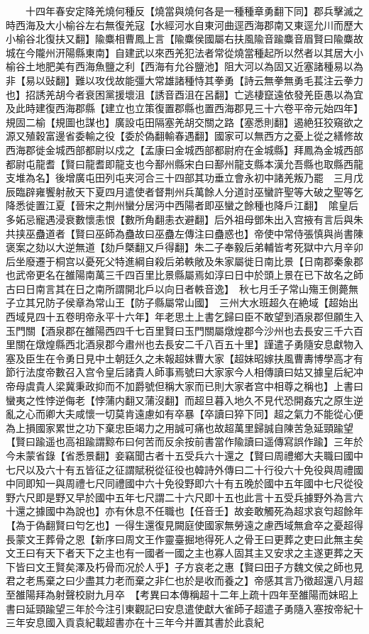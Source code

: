 　　十四年春安定降羌燒何種反【燒當與燒何各是一種種章勇翻下同】郡兵擊滅之時西海及大小榆谷左右無復羌寇【水經河水自東河曲逕西海郡南又東逕允川而歷大小榆谷北復扶又翻】隃麋相曹鳳上言【隃麋侯國屬右扶風隃音踰麋音眉賢曰隃麋故城在今隴州汧陽縣東南】自建武以來西羌犯法者常從燒當種起所以然者以其居大小榆谷土地肥美有西海魚鹽之利【西海有允谷鹽池】阻大河以為固又近塞諸種易以為非【易以䜴翻】難以攻伐故能彊大常雄諸種恃其拳勇【詩云無拳無勇毛萇注云拳力也】招誘羌胡今者衰困黨援壞沮【誘音酉沮在呂翻】亡逃棲竄遠依發羌臣愚以為宜及此時建復西海郡縣【建立也立策復置郡縣也置西海郡見三十六卷平帝元始四年】規固二榆【規圖也謀也】廣設屯田隔塞羌胡交關之路【塞悉則翻】遏絶狂狡窺欲之源又殖穀富邊省委輸之役【委於偽翻輸春遇翻】國家可以無西方之憂上從之繕修故西海郡徙金城西部都尉以戍之【孟康曰金城西部都尉府在金城縣】拜鳳為金城西部都尉屯龍耆【賢曰龍耆即龍支也今鄯州縣宋白曰鄯州龍支縣本漢允吾縣也取縣西龍支堆為名】後增廣屯田列屯夹河合三十四部其功垂立會永初中諸羌叛乃罷　三月戊辰臨辟雍饗射赦天下夏四月遣使者督荆州兵萬餘人分道討巫蠻許聖等大破之聖等乞降悉徙置江夏【晉宋之荆州蠻分居沔中西陽者即巫蠻之餘種也降戶江翻】　隂皇后多妬忌寵遇浸衰數懷恚恨【數所角翻恚衣避翻】后外祖母鄧朱出入宫掖有言后與朱共挟巫蠱道者【賢曰巫師為蠱故曰巫蠱左傳注曰蠱惑也】帝使中常侍張慎與尚書陳褒案之劾以大逆無道【劾戶槩翻又戶得翻】朱二子奉毅后弟輔皆考死獄中六月辛卯后坐廢遷于桐宫以憂死父特進綱自殺后弟軼敞及朱家屬徙日南比景【日南郡秦象郡也武帝更名在雒陽南萬三千四百里比景縣屬焉如淳曰日中於頭上景在已下故名之師古曰日南言其在日之南所謂開北戶以向日者軼音逸】　秋七月壬子常山殤王側薨無子立其兄防子侯章為常山王【防子縣屬常山國】　三州大水班超久在絶域【超始出西域見四十五卷明帝永平十六年】年老思土上書乞歸曰臣不敢望到酒泉郡但願生入玉門關【酒泉郡在雒陽西四千七百里賢曰玉門關屬燉煌郡今沙州也去長安三千六百里關在燉煌縣西北酒泉郡今肅州也去長安二千八百五十里】謹遣子勇隨安息獻物入塞及臣生在令勇日見中土朝廷久之未報超妹曹大家【超妹昭嫁扶風曹夀博學高才有節行法度帝數召入宫令皇后諸貴人師事焉號曰大家家今人相傳讀曰姑又據皇后紀冲帝母虞貴人梁冀秉政抑而不加爵號但稱大家而已則大家者宫中相尊之稱也】上書曰蠻夷之性悖逆侮老【悖蒲内翻又蒲沒翻】而超旦暮入地久不見代恐開姦宄之原生逆亂之心而卿大夫咸懷一切莫肯遠慮如有卒暴【卒讀曰猝下同】超之氣力不能從心便為上損國家累世之功下棄忠臣竭力之用誠可痛也故超萬里歸誠自陳苦急延頸踰望【賢曰踰遥也高祖踰謂黥布曰何苦而反余按前書當作隃讀曰遥傳寫誤作踰】三年於今未蒙省錄【省悉景翻】妾竊聞古者十五受兵六十還之【賢曰周禮鄉大夫職曰國中七尺以及六十有五皆征之征謂賦税從征役也韓詩外傳曰二十行役六十免役與周禮國中同即知一與周禮七尺同禮國中六十免役野即六十有五晚於國中五年國中七尺從役野六尺即是野又早於國中五年七尺謂二十六尺即十五也此言十五受兵據野外為言六十還之據國中為說也】亦有休息不任職也【任音壬】故妾敢觸死為超求哀匄超餘年【為于偽翻賢曰匄乞也】一得生還復見闕庭使國家無勞遠之慮西域無倉卒之憂超得長蒙文王葬骨之恩【新序曰周文王作靈臺掘地得死人之骨王曰更葬之吏曰此無主矣文王曰有天下者天下之主也有一國者一國之主也寡人固其主又安求之主遂更葬之天下皆曰文王賢矣澤及朽骨而况於人乎】子方哀老之惠【賢曰田子方魏文侯之師也見君之老馬棄之曰少盡其力老而棄之非仁也於是收而養之】帝感其言乃徵超還八月超至雒陽拜為射聲校尉九月卒　【考異曰本傳稱超十二年上疏十四年至雒陽而妹昭上書曰延頸踰望三年於今注引東觀記曰安息遣使獻大雀師子超遣子勇隨入塞按帝紀十三年安息國入貢袁紀載超書亦在十三年今并置其書於此袁紀